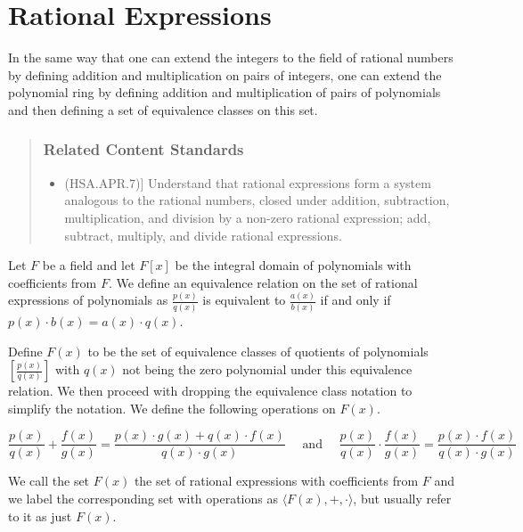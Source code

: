 \documentclass[
]{book}
\providecommand{\tightlist}{%
  \setlength{\itemsep}{0pt}\setlength{\parskip}{0pt}}
\theoremstyle{definition}
\theoremstyle{definition}
\theoremstyle{definition}
\theoremstyle{remark}
\begin{document}
\hypertarget{rational-expressions}{%
\section{Rational Expressions}\label{rational-expressions}}

In the same way that one can extend the integers to the field of rational numbers by defining addition and multiplication on pairs of integers, one can extend the polynomial ring by defining addition and multiplication of pairs of polynomials and then defining a set of equivalence classes on this set.

\begin{quote}
\hypertarget{related-content-standards-35}{%
\subsubsection*{Related Content Standards}\label{related-content-standards-35}}

\begin{itemize}
\tightlist
\item
  (HSA.APR.7){]} Understand that rational expressions form a system analogous to the rational numbers, closed under addition, subtraction, multiplication, and division by a non-zero rational expression; add, subtract, multiply, and divide rational expressions.
\end{itemize}
\end{quote}

Let \(F\) be a field and let \(F[x]\) be the integral domain of polynomials with coefficients from \(F\). We define an equivalence relation on the set of rational expressions of polynomials as \(\frac{p(x)}{q(x)}\) is equivalent to \(\frac{a(x)}{b(x)}\) if and only if \(p(x) \cdot b(x)=a(x)\cdot q(x)\).

Define \(F(x)\) to be the set of equivalence classes of quotients of polynomials \(\left[\frac{p(x)}{q(x)}\right]\) with \(q(x)\) not being the zero polynomial under this equivalence relation. We then proceed with dropping the equivalence class notation to simplify the notation. We define the following operations on \(F(x)\).

\[\frac{p(x)}{q(x)} + \frac{f(x)}{g(x)} = \frac{p(x)\cdot g(x) + q(x) \cdot f(x)}{q(x)\cdot g(x)} \quad \mbox{ and } \quad \frac{p(x)}{q(x)} \cdot \frac{f(x)}{g(x)} = \frac{p(x) \cdot f(x)}{q(x)\cdot g(x)}\]

We call the set \(F(x)\) the set of rational expressions with coefficients from \(F\) and we label the corresponding set with operations as \(\langle F(x),+,\cdot\rangle\), but usually refer to it as just \(F(x)\).
\end{document}
